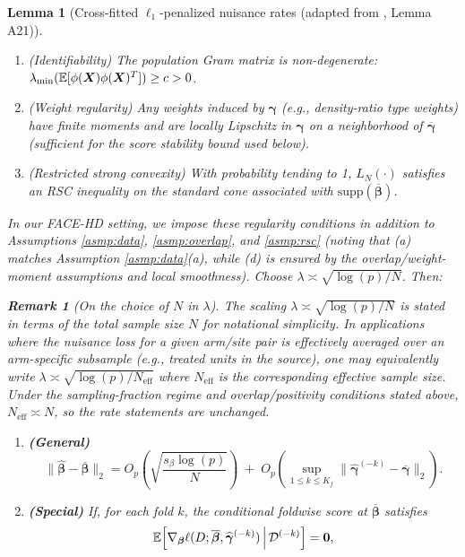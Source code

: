 \documentclass{article}
\newtheorem{lemma}[theorem]{Lemma}
\newtheorem{remark}{Remark}[section]
\begin{document}
\begin{lemma}[Cross-fitted $\ell_1$-penalized nuisance rates (adapted from \citet{hou2025efficient}, Lemma A21)]
\begin{enumerate}
    \item[(c)] (Identifiability) The population Gram matrix is non-degenerate: $\lambda_{\min}(\operatorname{\mathbb{E}}[\phi(\boldsymbol{X})\phi(\boldsymbol{X})^T])\ge c>0$.
    \item[(d)] (Weight regularity) Any weights induced by $\boldsymbol{\gamma}$ (e.g., density-ratio type weights) have finite moments and are locally Lipschitz in $\boldsymbol{\gamma}$ on a neighborhood of $\overline{\boldsymbol{\gamma}}$ (sufficient for the score stability bound used below).
    \item[(e)] (Restricted strong convexity) With probability tending to 1, $L_N(\cdot)$ satisfies an RSC inequality on the standard cone associated with $\mathrm{supp}(\overline{\boldsymbol{\beta}})$.
\end{enumerate}
In our FACE-HD setting, we impose these regularity conditions in addition to Assumptions \ref{asmp:data}, \ref{asmp:overlap}, and \ref{asmp:rsc} (noting that (a) matches Assumption \ref{asmp:data}(a), while (d) is ensured by the overlap/weight-moment assumptions and local smoothness). Choose $\lambda\asymp\sqrt{\log(p)/N}$. Then:
\begin{remark}[On the choice of $N$ in $\lambda$]
The scaling $\lambda\asymp\sqrt{\log(p)/N}$ is stated in terms of the total sample size $N$ for notational simplicity. In applications where the nuisance loss for a given arm/site pair is effectively averaged over an arm-specific subsample (e.g., treated units in the source), one may equivalently write $\lambda\asymp\sqrt{\log(p)/N_{\mathrm{eff}}}$ where $N_{\mathrm{eff}}$ is the corresponding effective sample size. Under the sampling-fraction regime and overlap/positivity conditions stated above, $N_{\mathrm{eff}}\asymp N$, so the rate statements are unchanged.
\end{remark}
\begin{enumerate}
    \item \textbf{(General)} 
    \[
    \|\widehat{\boldsymbol{\beta}}-\overline{\boldsymbol{\beta}}\|_2
    =
    O_p\!\left(\sqrt{\frac{s_\beta\log(p)}{N}}\right)
    \;+\;
    O_p\!\left(\sup_{1\le k\le K_f}\|\widehat{\boldsymbol{\gamma}}^{(-k)}-\overline{\boldsymbol{\gamma}}\|_2\right).
    \]
    \item \textbf{(Special)} If, for each fold $k$, the conditional foldwise score at $\overline{\boldsymbol{\beta}}$ satisfies
    \[
    \operatorname{\mathbb{E}}\!\left[\nabla_{\boldsymbol{\beta}}\ell(D;\overline{\boldsymbol{\beta}},\widehat{\boldsymbol{\gamma}}^{(-k)})\,\middle|\,\mathcal{D}^{(-k)}\right]
    =\mathbf{0},
\]
\end{enumerate}
\end{lemma}
\end{document}
